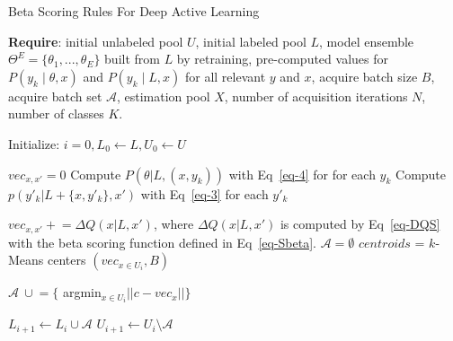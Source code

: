 \documentclass[letterpaper]{article} %
\begin{document}
\begin{algorithm}[tb]\small
\caption{Beta Scoring Rules For Deep Active Learning}
\label{alg:alg-ensemble}
  
\textbf{Require}: initial unlabeled pool $U$, initial labeled pool $L$, model ensemble $\Theta^E=\{\theta_1,...,\theta_E\}$ built from $L$ by retraining, pre-computed values for $P(y_k \mid \theta,x )$ and $P(y_k \mid L, x )$ for all relevant $y$ and $x$, acquire batch size $B$, acquire batch set $\mathcal{A}$, estimation pool $X$, number of acquisition iterations $N$, number of classes $K$.
\begin{algorithmic}[1]\small
\STATE Initialize: $i=0,L_0\leftarrow L, U_0\leftarrow U$
    
   
    \STATE  $vec_{x,x'} = 0$
    \STATE 
    Compute $P(\theta|L,(x,y_k))$ with Eq~\eqref{eq-4} for for each $y_k$
    \STATE 
    Compute $p(y'_k|L+\{x,y'_k\},x')$ with Eq~\eqref{eq-3} for each $y'_k$
     
    \ENDFOR
  \STATE $vec_{x,x'} +\!\!\!= 
    \Delta Q(x|L,x')$, where $\Delta Q(x|L,x')$ is computed by Eq~\eqref{eq-DQS} with
    the beta scoring function defined in Eq~\eqref{eq-Sbeta}.
    \ENDFOR
    \STATE $\mathcal{A} = \emptyset$
    \STATE $centroids$ = $k$-Means centers $(vec_{x\in U_i}, B)$
        
    \STATE $\mathcal{A}  ~\cup\!\!= \{$ argmin$_{x \in U_i}||c - vec_{x}|| \}$
    \ENDFOR

        \STATE $L_{i+1}\leftarrow L_i \cup \mathcal{A} $
        \STATE $U_{i+1}\leftarrow U_i \setminus \mathcal{A} $

    \ENDWHILE
  \end{algorithmic}
\end{algorithm}
\end{document}
